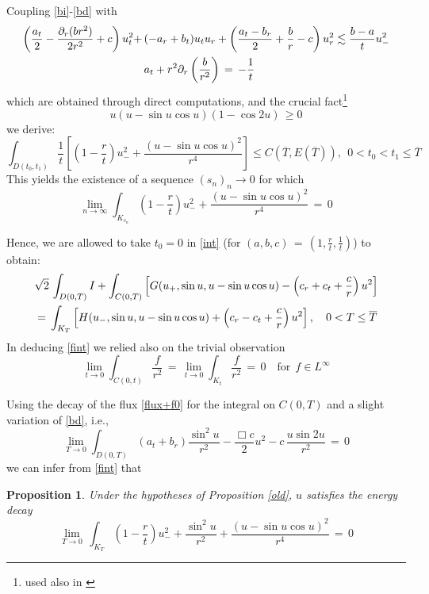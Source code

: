 \documentclass{amsart}
\newtheorem{prop}[theorem]{Proposition}
\begin{document}
Coupling \eqref{bi}-\eqref{bd} with
\[\aligned
\left(\frac{a_t}{2}-\frac{\partial_r(br^2)}{2r^2} +
c\right) u_{t}^2+\, &(-a_r+b_t) u_t u_r +
\left(\frac{a_t-b_r}{2}+\frac{b}{r} - c\right) u_{r}^2
\lesssim \frac{b-a}{t} u_-^2\\
&a_t +
r^2\partial_r\left(\frac{b}{r^2}\right)\,=\,-\frac{1}{t}
\endaligned\]
which are obtained through direct computations, and the crucial fact\footnote{used also in \cite{GR1}}
\begin{equation}
u(u-\sin u \cos u)(1- \cos 2u)\,\geq 0\label{pos}\end{equation}
we derive:
\[
\int_{D(t_0,t_1)} \frac{1}{t}\left[(1-\frac{r}{t})u_-^2 + \frac{(u-\sin u \cos u)^2}{r^4}\right] \leq  C(\overline{T}, E(\overline{T})), \ \ 0<t_0<t_1\leq \overline{T}
\]
This yields the existence of a sequence $(s_n)_n \to 0$ for which
\begin{equation}
\lim_{n\to\infty} \int_{K_{s_n}}  (1-\frac{r}{t})u_-^2 + \frac{(u-\sin u \cos u)^2}{r^4}\,=\,0
\label{de}
\end{equation}

Hence, we are allowed to take $t_0 = 0$ in \eqref{int} (for $(a,b,c)\,=\,\left(1, \frac{r}{t}, \frac{1}{t} \right)$) to obtain:
\begin{equation}
\aligned &\sqrt 2\,\int_{D(0,T)} I + \int_{C(0,T)} \left[ G(u_+, \sin u, u-\sin u \cos u)-\left(c_r+c_t+\frac{c}{r}\right)u^2\right]\\
&=\,\int_{K_{T}}  \left[ H(u_-, \sin u, u-\sin u \cos u)+\left(c_r-c_t+\frac{c}{r}\right)u^2\right], \quad 0<T\leq \overline{T}\\
\endaligned
\label{fint}
\end{equation}
In deducing \eqref{fint} we relied also on the trivial observation
\begin{equation}
\lim_{t\to 0}  \int_{C(0,t)} \frac{f}{r^2} \,=\,
\lim_{t\to 0} \int_{K_t} \frac{f}{r^2} \,=\,0 \quad \text{for} \ \ f \in L^\infty
\label{r2}
\end{equation}

Using the decay of the flux \eqref{flux+f0} for the integral on $C(0,T)$ and a slight variation of \eqref{bd}, i.e.,
\[
\lim_{T\to 0} \int_{D(0,T)} (a_t + b_r)\frac{\sin^2u}{r^2} - \frac{\Box c}{2}u^2 - c\,\frac{u\sin 2u}{r^2} \,=\,0
\]
we can infer from \eqref{fint} that

\begin{prop}
Under the hypotheses of Proposition \ref{old}, $u$ satisfies the energy decay
\begin{equation}
\lim_{T\to 0}\, \int_{K_{T}} \left(1-\frac{r}{t}\right) u_-^2 + \frac{\sin^2u}{r^2}+\frac{(u-\sin u \cos u)^2}{r^4}\,=\,0
\label{energy}\end{equation}
\end{prop}
\end{document}
